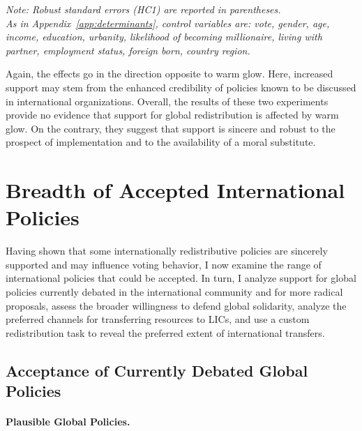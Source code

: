 \documentclass[12pt,english]{article}
\begin{document}
\begin{table}[!htbp] 
  \caption[Effect on support for global redistribution of believing that it is likely]{Effect on support for global redistribution of believing that it is likely.}\label{tab:iv} 
  \makebox[\textwidth][c]{} %
  \textit{Note: Robust standard errors (HC1) are reported in parentheses. \\ %
  As in Appendix~\ref{app:determinants}, control variables are: vote, gender, age, income, education, urbanity, likelihood of becoming millionaire, living with partner, employment status, foreign born, country region.}
\end{table}

Again, the effects go in the direction opposite to warm glow. Here, increased support may stem from the enhanced credibility of policies known to be discussed in international organizations. 
Overall, the results of these two experiments provide no evidence that support for global redistribution is affected by warm glow. On the contrary, they suggest that support is sincere and robust to the prospect of implementation and to the availability of a moral substitute.


\section{Breadth of Accepted International Policies\label{sec:breadth}}

Having shown that some internationally redistributive policies are sincerely supported and may influence voting behavior, I now examine the range of international policies that could be accepted. In turn, I analyze support for global policies currently debated in the international community and for more radical proposals, assess the broader willingness to defend global solidarity, analyze the preferred channels for transferring resources to LICs, and use a custom redistribution task to reveal the preferred extent of international transfers. 

\subsection{Acceptance of Currently Debated Global Policies}\label{subsec:debated}

\paragraph{Plausible Global Policies.}
\end{document}
